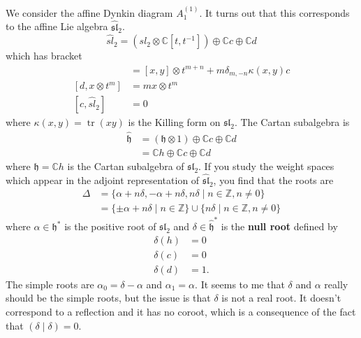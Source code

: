 \documentclass[12pt]{article}
\begin{document}
\begin{example}
    [Affine $\sl_2$] We consider the affine Dynkin diagram $A_1^{(1)}$. It turns out that this corresponds to the affine Lie algebra $\widehat{\mathfrak{sl}}_2$. 
    \[\widehat{sl}_2 = (sl_2\otimes\mathbb C[t,t^{-1}]) \oplus \mathbb Cc \oplus \mathbb Cd\] which has bracket \begin{align*}
    [x\otimes t^m, y\otimes t^n] &= [x,y]\otimes t^{m+n} + m\delta_{m,-n}\kappa(x,y)c \\
    [d, x\otimes t^m] &= m x\otimes t^m \\
    [c, \widehat{sl}_2] &= 0
\end{align*} where $\kappa(x,y) = \operatorname{tr}(xy)$ is the Killing form on $\mathfrak{sl}_2$. The Cartan subalgebra is \begin{align*}
    \widehat{\mathfrak{h}} &= (\mathfrak{h}\otimes 1) \oplus \mathbb{C}c \oplus \mathbb{C}d \\
    &= \mathbb{C}h \oplus \mathbb{C}c \oplus \mathbb{C}d
\end{align*} where $\mathfrak{h} = \mathbb{C}h$ is the Cartan subalgebra of $\mathfrak{sl}_2$. If you study the weight spaces which appear in the adjoint representation of $\widehat{\mathfrak{sl}}_2$, you find that the roots are \begin{align*}
    \Delta &= \{\alpha + n\delta, -\alpha + n\delta, n\delta \mid n \in \mathbb{Z}, n \neq 0\} \\
    &= \{\pm \alpha + n\delta \mid n \in \mathbb{Z}\} \cup \{n\delta \mid n \in \mathbb{Z}, n \neq 0\}
\end{align*} where $\alpha \in \mathfrak{h}^*$ is the positive root of $\mathfrak{sl}_2$ and $\delta \in \widehat{\mathfrak{h}}^*$ is the \textbf{null root} defined by \begin{align*}
    \delta(h) &= 0 \\
    \delta(c) &= 0 \\
    \delta(d) &= 1.
\end{align*} The simple roots are $\alpha_0 = \delta - \alpha$ and $\alpha_1 = \alpha$. It seems to me that $\delta$ and $\alpha$ really should be the simple roots, but the issue is that $\delta$ is not a real root. It doesn't correspond to a reflection and it has no coroot, which is a consequence of the fact that $(\delta \mid \delta) = 0$. 


\end{example}
\end{document}
